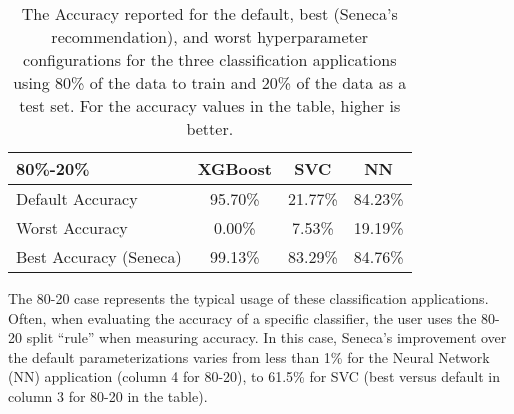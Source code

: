 \begin{table}
\centering
\begin{tabular}{|l|c|c|c|}
\hline
\textbf{80\%-20\%} & XGBoost & SVC & NN\\
\hline
\hline
Default Accuracy & 95.70\% & 21.77\% & 84.23\%\\
\hline
Worst Accuracy&0.00\%&7.53\% & 19.19\%\\
\hline
Best Accuracy (Seneca) &99.13\% & 83.29\% & 84.76\%\\
\hline

\end{tabular}
\caption{The Accuracy reported for the 
default, best (Seneca's recommendation), and worst hyperparameter configurations for 
the three classification applications using 80\% of the data to train and 20\%
of the data as a test set. 
For the accuracy values in the table, higher is better.
\label{tab:accuracy}}
\vspace{-0.2in}
\end{table}


The 80-20 case represents the typical usage of these classification
applications.  Often, when evaluating the accuracy of a specific classifier,
the user uses the 80-20 split ``rule'' when measuring accuracy.  In this case,
Seneca's improvement over the default parameterizations varies from less than
1\% for the Neural Network (NN) application (column 4 for 80-20), to 61.5\% for SVC
(best versus default in column 3 for 80-20 in the table). 

